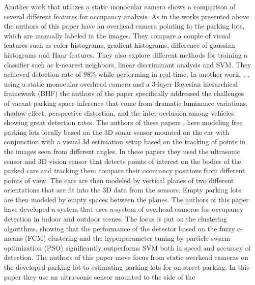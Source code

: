 \newline
Another work that utilizes a static monocular camera \cite{tschentscher} shows a
comparison of several different features for occupancy analysis. As in the works
presented above the authors of this paper have an overhead camera pointing to
the parking lots, which are manually labeled in the images. They compare a
couple of visual features such as color histograms, gradient histograms,
difference of gaussian histograms and Haar features. They also explore different
methods for training a classifier such as k-nearest neighbors, linear
discriminant analysis and SVM. They achieved detection rate of 98\% while
performing in real time.
\newline
In another work, \cite{chingchun10}, \cite{chingjao10}, using a static monocular
overhead camera and a 3-layer Bayesian hierarchical framework (BHF) the authors
of the paper specifically addressed the challenges of vacant parking space
inference that come from dramatic luminance variations, shadow effect,
perspective distortion, and the inter-occlusion among vehicles showing great
detection rates.
\newline
The authors of these papers \cite{fintyelvestri}, \cite{abadvestri} here
modeling free parking lots locally based on the 3D sonar sensor mounted on the
car with conjunction with a visual 3d estimation setup based on the tracking of
points in the images seen from different angles. In these papers they used the
ultrasonic sensor and 3D vision sensor that detects points of interest on the
bodies of the parked cars and tracking them compare their occurancy positions
from different points of view. The cars are then modeled by vertical planes of
two different orientations that are fit into the 3D data from the sensors. Empty
parking lots are then modeled by empty spaces between the planes.
\newline
The authors of this paper \cite{ichihashi} have developed a system that uses a
system of overhead cameras for occupancy detection in indoor and outdoor scenes.
The focus is put on the clustering algorithms, showing that the performance of
the detector based on the fuzzy c-means (FCM) clustering and the hyperparameter
tuning by particle swarm optimization (PSO) significantly outperforms SVM both
in speed and accuracy of detection.
\newline
The authors of this paper \cite{vladimircoric} move focus from static overhead
cameras on the developed parking lot to estimating parking lots for on-street
parking. In this paper they use an ultra-sonic sensor mounted to the side of the
